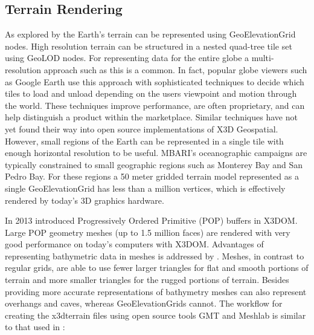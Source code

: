 \documentclass[conference]{IEEEtran}
\begin{document}
\subsection{Terrain Rendering}

As explored by \cite{yoo09} the Earth's terrain can be represented using GeoElevationGrid nodes. High resolution terrain can be structured in a nested quad-tree tile set using GeoLOD nodes. For representing data for the entire globe a multi-resolution approach such as this is a common. In fact, popular globe viewers such as Google Earth use this approach with sophisticated techniques to decide which tiles to load and unload depending on the users viewpoint and motion through the world. These techniques improve performance, are often proprietary, and can help distinguish a product within the marketplace. Similar techniques have not yet found their way into open source implementations of X3D Geospatial. However, small regions of the Earth can be represented in a single tile with enough horizontal resolution to be useful. MBARI's oceanographic campaigns are typically constrained to small geographic regions such as Monterey Bay and San Pedro Bay. For these regions a 50 meter gridded terrain model represented as a single GeoElevationGrid has less than a million vertices, which is effectively  rendered by today's 3D graphics hardware.

In 2013 \cite{Limper:2013:FDW:2466533.2466536} introduced Progressively Ordered Primitive (POP) buffers in X3DOM. Large POP geometry meshes (up to 1.5 million faces) are rendered with very good performance on today's computers with X3DOM. Advantages of representing bathymetric data in meshes is addressed by \cite{Becker:2005:NPN:1650409.1650513}. Meshes, in contrast to regular grids, are able to use fewer larger triangles for flat and smooth portions of terrain and more smaller triangles for the rugged portions of terrain. Besides providing more accurate representations of bathymetry meshes can also represent overhangs and caves, whereas GeoElevationGrids cannot. The workflow for creating the x3dterrain files using open source tools GMT \cite{GMT} and Meshlab \cite{Meshlab} is similar to that used in \cite{Silvestre}:
\end{document}
